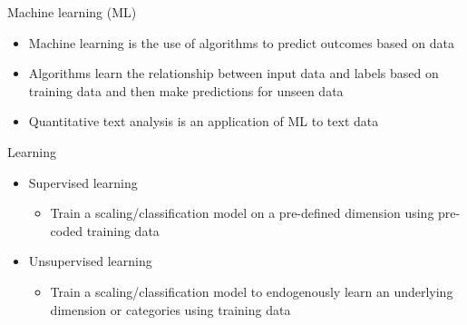 \documentclass[pdf, 9pt, fleqn, handout]{beamer}
\begin{document}
\begin{frame}{Machine learning (ML)}
\begin{itemize}
\item Machine learning is the use of algorithms to predict outcomes based on data \\[2em]
\item Algorithms learn the relationship between input data and labels based on training data and then make predictions for unseen data \\[2em]
\item Quantitative text analysis is an application of ML to text data
\end{itemize}
\end{frame}

\begin{frame}{Learning}
\begin{itemize}
\item Supervised learning \\[0.5em]
\begin{itemize}
\item Train a scaling/classification model on a pre-defined dimension using pre-coded training data \\[2em]
\end{itemize}
\item Unsupervised learning \\[0.5em]
\begin{itemize}
\item Train a scaling/classification model to endogenously learn an underlying dimension or categories using training data
\end{itemize}
\end{itemize}
\end{frame}
\end{document}
